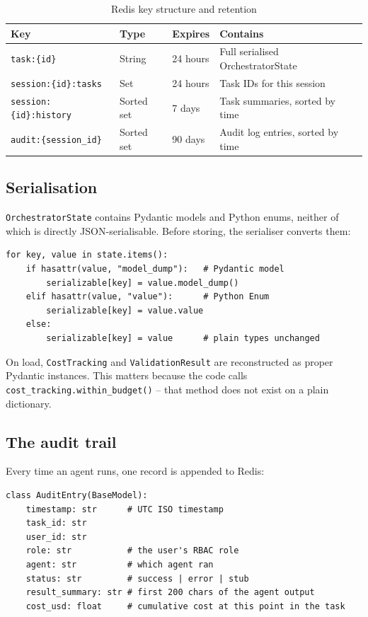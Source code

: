 \documentclass[12pt,a4paper]{article}
\begin{document}
\begin{table}[H]
\centering
\small
\begin{tabular}{@{}p{4.2cm}p{2.0cm}p{1.8cm}p{5.5cm}@{}}
\toprule
\textbf{Key} & \textbf{Type} & \textbf{Expires} & \textbf{Contains} \\
\midrule
\texttt{task:\{id\}}            & String      & 24 hours & Full serialised OrchestratorState \\
\texttt{session:\{id\}:tasks}   & Set         & 24 hours & Task IDs for this session \\
\texttt{session:\{id\}:history} & Sorted set  & 7 days   & Task summaries, sorted by time \\
\texttt{audit:\{session\_id\}}  & Sorted set  & 90 days  & Audit log entries, sorted by time \\
\bottomrule
\end{tabular}
\caption{Redis key structure and retention}
\end{table}

\subsection{Serialisation}

\texttt{OrchestratorState} contains Pydantic models and Python enums, neither of which is directly JSON-serialisable. Before storing, the serialiser converts them:

\begin{lstlisting}[caption={Converting special types before storing in Redis}]
for key, value in state.items():
    if hasattr(value, "model_dump"):   # Pydantic model
        serializable[key] = value.model_dump()
    elif hasattr(value, "value"):      # Python Enum
        serializable[key] = value.value
    else:
        serializable[key] = value      # plain types unchanged
\end{lstlisting}

On load, \texttt{CostTracking} and \texttt{ValidationResult} are reconstructed as proper Pydantic instances. This matters because the code calls \texttt{cost\_tracking.within\_budget()} -- that method does not exist on a plain dictionary.

\subsection{The audit trail}

Every time an agent runs, one record is appended to Redis:

\begin{lstlisting}[caption={AuditEntry fields}]
class AuditEntry(BaseModel):
    timestamp: str      # UTC ISO timestamp
    task_id: str
    user_id: str
    role: str           # the user's RBAC role
    agent: str          # which agent ran
    status: str         # success | error | stub
    result_summary: str # first 200 chars of the agent output
    cost_usd: float     # cumulative cost at this point in the task
\end{lstlisting}
\end{document}
